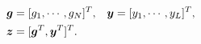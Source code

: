 \documentclass[useAMS,usenatbib]{mn2e}
\newcommand{\bz}{\bmath{z}}
\newcommand{\bg}{\bmath{g}}
\newcommand{\by}{\bmath{y}}
\begin{document}
\begin{align}
 \bg &=[g_1,\cdots,g_N]^T, & \by &= [y_1,\cdots,y_L]^T,\nonumber\\
 \bz &= [\bg^T,\by^T]^T. &  &\label{eq:parm_definitions}
 \end{align}

% 
\end{document}
